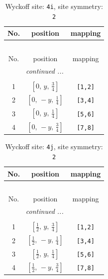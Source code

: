 \documentclass[fleqn,8pt]{jsarticle}
\begin{document}
\begin{longtable}{ccc}
\caption{Wyckoff site: {\tt 4i}, site symmetry: {\tt 2}}
 \\
 \hline \hline
No. & position & mapping \\ \hline \endfirsthead

\multicolumn{2}{l}{\tablename\ \thetable{}} \\
 \hline \hline
No. & position & mapping \\ \hline \endhead

 \hline \hline
\multicolumn{2}{r}{\footnotesize\it continued ...} \\ \endfoot

 \hline \hline
\multicolumn{2}{r}{} \\ \endlastfoot

1 & $\left[ 0,\, y,\, \frac{3}{4} \right]$ & {\tt [1,2]} \\ \hline
2 & $\left[ 0,\, - y,\, \frac{1}{4} \right]$ & {\tt [3,4]} \\ \hline
3 & $\left[ 0,\, y,\, \frac{1}{4} \right]$ & {\tt [5,6]} \\ \hline
4 & $\left[ 0,\, - y,\, \frac{3}{4} \right]$ & {\tt [7,8]} \\
\end{longtable}
\renewcommand{\arraystretch}{1.2}
\begin{longtable}{ccc}
\caption{Wyckoff site: {\tt 4j}, site symmetry: {\tt 2}}
 \\
 \hline \hline
No. & position & mapping \\ \hline \endfirsthead

\multicolumn{2}{l}{\tablename\ \thetable{}} \\
 \hline \hline
No. & position & mapping \\ \hline \endhead

 \hline \hline
\multicolumn{2}{r}{\footnotesize\it continued ...} \\ \endfoot

 \hline \hline
\multicolumn{2}{r}{} \\ \endlastfoot

1 & $\left[ \frac{1}{2},\, y,\, \frac{3}{4} \right]$ & {\tt [1,2]} \\ \hline
2 & $\left[ \frac{1}{2},\, - y,\, \frac{1}{4} \right]$ & {\tt [3,4]} \\ \hline
3 & $\left[ \frac{1}{2},\, y,\, \frac{1}{4} \right]$ & {\tt [5,6]} \\ \hline
4 & $\left[ \frac{1}{2},\, - y,\, \frac{3}{4} \right]$ & {\tt [7,8]} \\
\end{longtable}
\end{document}
